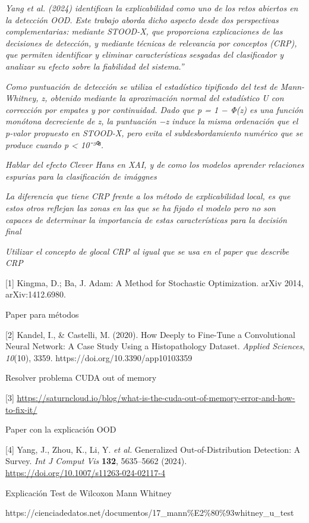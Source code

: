 \emph{Yang et al. (2024) identifican la explicabilidad como uno de los
retos abiertos en la detección OOD. Este trabajo aborda dicho aspecto
desde dos perspectivas complementarias: mediante STOOD-X, que
proporciona explicaciones de las decisiones de detección, y mediante
técnicas de relevancia por conceptos (CRP), que permiten identificar y
eliminar características sesgadas del clasificador y analizar su efecto
sobre la fiabilidad del sistema.''}

\emph{Como puntuación de detección se utiliza el estadístico tipificado
del test de Mann-Whitney, z, obtenido mediante la aproximación normal
del estadístico U con corrección por empates y por continuidad. Dado que
p = 1 − Φ(z) es una función monótona decreciente de z, la puntuación −z
induce la misma ordenación que el p-valor propuesto en STOOD-X, pero
evita el subdesbordamiento numérico que se produce cuando p \textless{}
10⁻³⁰⁸.}

\emph{Hablar del efecto Clever Hans en XAI, y de como los modelos
aprender relaciones espurias para la clasificación de imággnes}

\emph{La diferencia que tiene CRP frente a los método de explicabilidad
local, es que estos otros reflejan las zonas en las que se ha fijado el
modelo pero no son capaces de determinar la importancia de estas
características para la decisión final}

\emph{Utilizar el concepto de glocal CRP al igual que se usa en el paper
que describe CRP}

{[}1{]} Kingma, D.; Ba, J. Adam: A Method for Stochastic Optimization.
arXiv 2014, arXiv:1412.6980.

Paper para métodos

{[}2{]} Kandel, I., \& Castelli, M. (2020). How Deeply to Fine-Tune a
Convolutional Neural Network: A Case Study Using a Histopathology
Dataset. \emph{Applied Sciences}, \emph{10}(10), 3359.
https://doi.org/10.3390/app10103359

Resolver problema CUDA out of memory

{[}3{]}
\href{https://saturncloud.io/blog/what-is-the-cuda-out-of-memory-error-and-how-to-fix-it/}{\ul{https://saturncloud.io/blog/what-is-the-cuda-out-of-memory-error-and-how-to-fix-it/}}

Paper con la explicación OOD

{[}4{]} Yang, J., Zhou, K., Li, Y. \emph{et al.} Generalized
Out-of-Distribution Detection: A Survey. \emph{Int J Comput Vis}
\textbf{132}, 5635--5662 (2024).
\href{https://doi.org/10.1007/s11263-024-02117-4}{\ul{https://doi.org/10.1007/s11263-024-02117-4}}

Explicación Test de Wilcoxon Mann Whitney

https://cienciadedatos.net/documentos/17\_mann\%E2\%80\%93whitney\_u\_test
